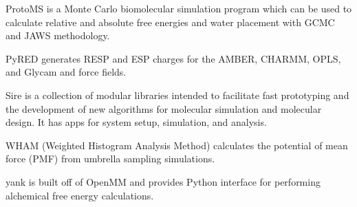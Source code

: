 ProtoMS \cite{Michel_2006} is a Monte Carlo biomolecular simulation program which can be used to calculate relative and absolute free energies and water placement with GCMC and JAWS methodology.

PyRED \cite{Dupradeau_2010} generates RESP and ESP charges for the AMBER, CHARMM, OPLS, and Glycam and force fields.

Sire is a collection of modular libraries intended to facilitate fast prototyping and the development of new algorithms for molecular simulation and molecular design. It has apps for system setup, simulation, and analysis.

WHAM (Weighted Histogram Analysis Method) calculates the potential of mean force (PMF) from umbrella sampling simulations.

yank is built off of OpenMM and provides Python interface for performing alchemical free energy calculations.